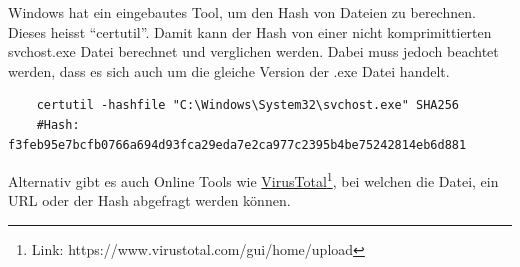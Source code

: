 Windows hat ein eingebautes Tool, um den Hash von Dateien zu berechnen.
Dieses heisst ``certutil''.
Damit kann der Hash von einer nicht komprimittierten svchost.exe Datei berechnet und verglichen werden.
Dabei muss jedoch beachtet werden, dass es sich auch um die gleiche Version der .exe Datei handelt.

\begin{lstlisting}
    certutil -hashfile "C:\Windows\System32\svchost.exe" SHA256
    #Hash: f3feb95e7bcfb0766a694d93fca29eda7e2ca977c2395b4be75242814eb6d881
\end{lstlisting}

Alternativ gibt es auch Online Tools wie \href{https://www.virustotal.com/gui/home/upload}{VirusTotal}\footnote{Link: https://www.virustotal.com/gui/home/upload}, bei welchen die Datei, ein URL oder der Hash abgefragt werden können.